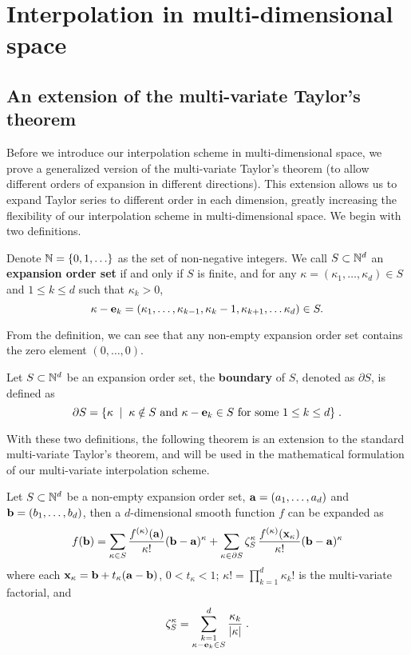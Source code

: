 \section{Interpolation in multi-dimensional space}

\subsection{An extension of the multi-variate Taylor's theorem}

Before we introduce our interpolation scheme in multi-dimensional space, we
prove a generalized version of the multi-variate Taylor's theorem (to
allow different orders of expansion in different directions).  This
extension allows us to expand Taylor series to different order in each
dimension, greatly increasing the flexibility of our interpolation scheme
in multi-dimensional space.  We begin with two definitions.
\begin{definition} \label{exp_set}
Denote $\mathbb{N} = \{0,1,\ldots\}$ as the set of non-negative integers.  We call
$S \subset \mathbb{N}^d$ an {\bf expansion order set} if and only if $S$ is finite, and
for any $\kappa = (\kappa_1, \ldots, \kappa_d) \in S$ and $1\le k\le d$ such
that $\kappa_k > 0$,
\[ \kappa - \mathbf{e}_k =
   (\kappa_1, \ldots, \kappa_{k-1}, \kappa_k-1, \kappa_{k+1}, \ldots \kappa_d)
   \in S . \]
\end{definition}
From the definition, we can see that any non-empty expansion order set contains
the zero element $(0,\ldots,0)$.
\begin{definition} \label{boundary_set}
Let $S \subset \mathbb{N}^d$ be an expansion order set, the {\bf boundary} of $S$,
denoted as $\partial S$, is defined as
\[ \partial S = \{\kappa \;\mid\; \kappa \notin S \mbox{ and }
   \kappa - \mathbf{e}_k \in S \mbox{ for some } 1\le k \le d \} \;.\]
\end{definition}
With these two definitions, the following theorem is an extension to the
standard multi-variate Taylor's theorem, and will be used in the mathematical
formulation of our multi-variate interpolation scheme.
\begin{theorem} \label{taylor_thm}
Let $S \subset \mathbb{N}^d$ be a non-empty expansion order set,
$\mathbf{a} = (a_1,\ldots,a_d)$ and $\mathbf{b} = (b_1,\ldots,b_d)$, then a $d$-dimensional
smooth function $f$ can be expanded as
\begin{equation} \label{taylor}
f(\mathbf{b}) = \sum_{\kappa\in S} \frac{f^{(\kappa)}(\mathbf{a})}{\kappa!} (\mathbf{b}-\mathbf{a})^\kappa
      + \sum_{\kappa\in \partial S} \zeta^\kappa_S \,
        \frac{f^{(\kappa)}(\mathbf{x}_\kappa)}{\kappa!} (\mathbf{b}-\mathbf{a})^\kappa
\end{equation}
where each $\mathbf{x}_\kappa = \mathbf{b} + t_\kappa (\mathbf{a}-\mathbf{b})$, $0<t_\kappa < 1$;
$\kappa! = \prod_{k=1}^d \kappa_k !$ is the multi-variate factorial, and
\[ \zeta^\kappa_S = \sum_{\substack{k=1\\ \kappa-\mathbf{e}_k\in S}}^d
   \frac{\kappa_k}{|\kappa|} \;.\]
\end{theorem}
